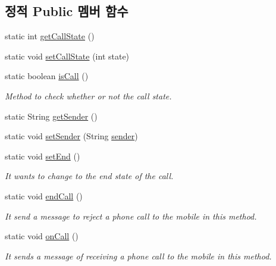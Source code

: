 \subsection*{정적 Public 멤버 함수}
\begin{DoxyCompactItemize}
\item 
static int \hyperlink{classkr_1_1ac_1_1kookmin_1_1cs_1_1call_1_1_call_listener_a7fceefa2570760dde2970fe8ffd8ceae}{get\+Call\+State} ()
\item 
static void \hyperlink{classkr_1_1ac_1_1kookmin_1_1cs_1_1call_1_1_call_listener_aec282649d8f8b5690d1bf7c5e7e73781}{set\+Call\+State} (int state)
\item 
static boolean \hyperlink{classkr_1_1ac_1_1kookmin_1_1cs_1_1call_1_1_call_listener_a886a6345c6f2ed74e64914984e270f6d}{is\+Call} ()
\begin{DoxyCompactList}\small\item\em Method to check whether or not the call state. \end{DoxyCompactList}\item 
static String \hyperlink{classkr_1_1ac_1_1kookmin_1_1cs_1_1call_1_1_call_listener_afcbd7b4289361b3d773cafa29f033f89}{get\+Sender} ()
\item 
static void \hyperlink{classkr_1_1ac_1_1kookmin_1_1cs_1_1call_1_1_call_listener_a4a5fc9ec67f36eed4c2e934875abf007}{set\+Sender} (String \hyperlink{classkr_1_1ac_1_1kookmin_1_1cs_1_1call_1_1_call_listener_a87caf58642cf13014f53edb0fdcda07b}{sender})
\item 
static void \hyperlink{classkr_1_1ac_1_1kookmin_1_1cs_1_1call_1_1_call_listener_a11abb308347a972e68de7eed6b569a7b}{set\+End} ()
\begin{DoxyCompactList}\small\item\em It wants to change to the end state of the call. \end{DoxyCompactList}\item 
static void \hyperlink{classkr_1_1ac_1_1kookmin_1_1cs_1_1call_1_1_call_listener_a8b9c6d3b52e1fe1e080f265eed49f0a9}{end\+Call} ()
\begin{DoxyCompactList}\small\item\em It send a message to reject a phone call to the mobile in this method. \end{DoxyCompactList}\item 
static void \hyperlink{classkr_1_1ac_1_1kookmin_1_1cs_1_1call_1_1_call_listener_a2fdc9350dd23a0b6a706919b2cd2c59e}{on\+Call} ()
\begin{DoxyCompactList}\small\item\em It sends a message of receiving a phone call to the mobile in this method. \end{DoxyCompactList}\end{DoxyCompactItemize}
